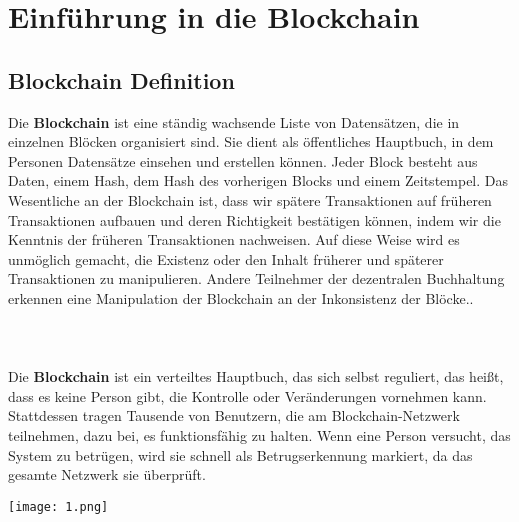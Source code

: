 \documentclass[ngerman]{scrreprt}
\begin{document}
\chapter{Einführung in die Blockchain}

\section{Blockchain Definition}
Die \textbf{Blockchain} ist eine ständig wachsende Liste von Datensätzen, die in einzelnen Blöcken organisiert sind. Sie dient als öffentliches Hauptbuch, in dem Personen Datensätze einsehen und erstellen können. Jeder Block besteht aus Daten, einem Hash, dem Hash des vorherigen Blocks und einem Zeitstempel. Das Wesentliche an der Blockchain ist, dass wir spätere Transaktionen auf früheren Transaktionen aufbauen und deren Richtigkeit bestätigen können, indem wir die Kenntnis der früheren Transaktionen nachweisen. Auf diese Weise wird es unmöglich gemacht, die Existenz oder den Inhalt früherer und späterer Transaktionen zu manipulieren. Andere Teilnehmer der dezentralen Buchhaltung erkennen eine Manipulation der Blockchain an der Inkonsistenz der Blöcke..\\
\\
\\
\\
Die \textbf{Blockchain} ist ein verteiltes Hauptbuch, das sich selbst reguliert, das heißt, dass es keine Person gibt, die Kontrolle oder Veränderungen vornehmen kann. Stattdessen tragen Tausende von Benutzern, die am Blockchain-Netzwerk teilnehmen, dazu bei, es funktionsfähig zu halten. Wenn eine Person versucht, das System zu betrügen, wird sie schnell als Betrugserkennung markiert, da das gesamte Netzwerk sie überprüft.


\texttt{[image: 1.png]}
\end{document}
